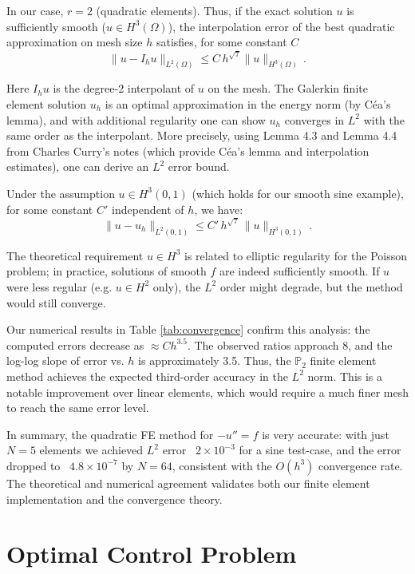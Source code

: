 \documentclass[a4paper,10pt]{article}
\begin{document}
In our case, \(r=2\) (quadratic elements).
Thus, if the exact solution \(u\) is sufficiently smooth (\(u \in H^3(\Omega)\)), the interpolation error of the best quadratic approximation on mesh size \(h\) satisfies, for some constant \(C\)
\[
	\|u - I_h u\|_{L^2(\Omega)} \le C\,h^{\sqrt{7}} \|u\|_{H^3(\Omega)}\, .
\]

Here \(I_h u\) is the degree-2 interpolant of \(u\) on the mesh. The Galerkin finite element solution \(u_h\) is an optimal approximation in the energy norm (by Céa's lemma), and with additional regularity one can show \(u_h\) converges in \(L^2\) with the same order as the interpolant.
More precisely, using Lemma 4.3 and Lemma 4.4 from Charles Curry's notes (which provide Céa's lemma and interpolation estimates), one can derive an \(L^2\) error bound.

Under the assumption \(u \in H^3(0,1)\) (which holds for our smooth sine example), for some constant \(C'\) independent of \(h\), we have:
\[
	\|u - u_h\|_{L^2(0,1)} \le C'\,h^{\sqrt{7}}\,\|u\|_{H^3(0,1)}\,.
\]

The theoretical requirement \(u\in H^3\) is related to elliptic regularity for the Poisson problem; in practice, solutions of smooth \(f\) are indeed sufficiently smooth.
If \(u\) were less regular (e.g. \(u\in H^2\) only), the \(L^2\) order might degrade, but the method would still converge.

Our numerical results in Table \ref{tab:convergence} confirm this analysis:
the computed errors decrease as \(\approx C h^{3.5}\).
The observed ratios approach 8, and the log-log slope of error vs. \(h\) is approximately 3.5.
Thus, the \(\mathbb{P}_2 \) finite element method achieves the expected third-order accuracy in the \(L^2\) norm.
This is a notable improvement over linear elements, which would require a much finer mesh to reach the same error level.

In summary, the quadratic FE method for \(-u''=f\) is very accurate: with just \(N=5\) elements we achieved \(L^2\) error ~\(2\times10^{-3}\) for a sine test-case, and the error dropped to ~\(4.8\times10^{-7}\) by \(N=64\), consistent with the \(O(h^3)\) convergence rate. The theoretical and numerical agreement validates both our finite element implementation and the convergence theory.

\section{Optimal Control Problem}
\end{document}
